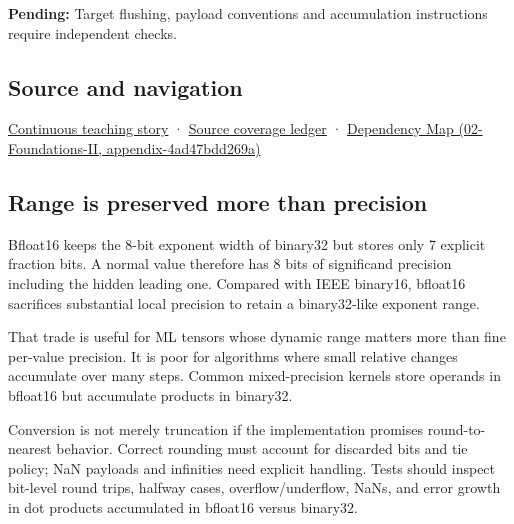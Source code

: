 \textbf{Pending:} Target flushing, payload conventions and accumulation instructions require independent checks.

\subsection{Source and navigation}\label{appendix-18b8dd966b5d-source-and-navigation}

\hyperref[01-foundations-i-ch001-choosing-what-information-to-keep]{Continuous teaching story} · \hyperref[appendix-fd090d982a15]{Source coverage ledger} · \href{../02-Foundations-II/main.pdf\#nameddest=appendix-4ad47bdd269a}{Dependency Map (02-Foundations-II, appendix-4ad47bdd269a)}

\subsection{Range is preserved more than precision}\label{appendix-18b8dd966b5d-range-is-preserved-more-than-precision}

Bfloat16 keeps the 8-bit exponent width of binary32 but stores only 7 explicit fraction bits. A normal value therefore has 8 bits of significand precision including the hidden leading one. Compared with IEEE binary16, bfloat16 sacrifices substantial local precision to retain a binary32-like exponent range.

That trade is useful for ML tensors whose dynamic range matters more than fine per-value precision. It is poor for algorithms where small relative changes accumulate over many steps. Common mixed-precision kernels store operands in bfloat16 but accumulate products in binary32.

Conversion is not merely truncation if the implementation promises round-to-nearest behavior. Correct rounding must account for discarded bits and tie policy; NaN payloads and infinities need explicit handling. Tests should inspect bit-level round trips, halfway cases, overflow/underflow, NaNs, and error growth in dot products accumulated in bfloat16 versus binary32.
